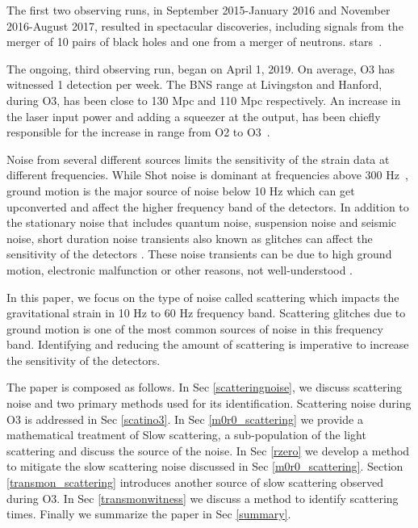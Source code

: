 \documentclass[12pt]{iopart}
\begin{document}
The first two observing runs, in September 2015-January 2016 and November 2016-August 2017, resulted in spectacular discoveries, including signals from the merger of 10 pairs of black holes and one from a merger of neutrons. stars~\cite{catalogue,firstpaper,neturonpaper}.

The ongoing, third observing run, began on April 1, 2019. On average, O3 has witnessed 1 detection per week. The BNS range at Livingston and Hanford, during O3, has been close to 130 Mpc and 110 Mpc respectively. An increase in the laser input power and adding a squeezer at the output, has been chiefly responsible for the increase in range from O2 to O3~\cite{src,prospect}.


Noise from several different sources limits the sensitivity of the strain data at different frequencies. 
While Shot noise is dominant at frequencies above 300 Hz~\cite{tjthesis}, ground motion is the major source of noise below 10 Hz which can get upconverted and affect the higher frequency band of the detectors. In addition to the stationary noise that includes quantum noise, suspension noise and seismic noise, short duration noise transients also known as glitches can affect the sensitivity of the detectors \cite{transientpaper}. These noise transients can be due to high ground motion, electronic malfunction or other reasons, not well-understood \cite{noisepaper,Cabero_2019}.

In this paper, we focus on the type of noise called scattering which impacts the gravitational strain in 10 Hz to 60 Hz frequency band. Scattering glitches due to ground motion is one of the most common sources of noise in this frequency band. Identifying and reducing the amount of scattering is imperative to increase the sensitivity of the detectors. 
 
The paper is composed as follows. In Sec \ref{scatteringnoise}, we discuss scattering noise and two primary methods used for its identification. Scattering noise during O3 is addressed in Sec   \ref{scatino3}. In Sec \ref{m0r0_scattering} we provide a mathematical treatment of Slow scattering, a sub-population of the light scattering and discuss the source of the noise. In Sec \ref{rzero} we develop a method to mitigate the slow scattering noise discussed in Sec \ref{m0r0_scattering}. Section \ref{transmon_scattering} introduces another source of slow scattering observed during O3. In Sec \ref{transmonwitness} we discuss a method to identify scattering times. Finally we summarize the paper in Sec \ref{summary}. 
\end{document}
